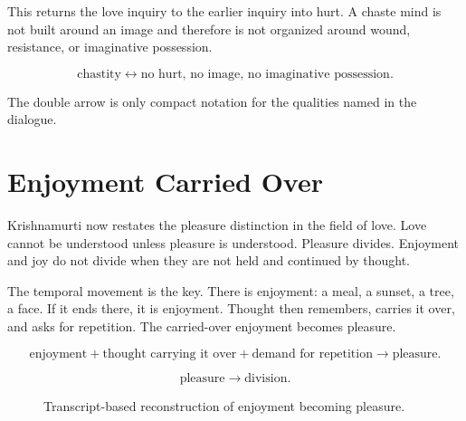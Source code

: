 \documentclass[11pt,oneside]{book}
\begin{document}
This returns the love inquiry to the earlier inquiry into hurt. A chaste mind is not built around an image and therefore is not organized around wound, resistance, or imaginative possession.

\begin{equation}
\text{chastity}
\longleftrightarrow
\text{no hurt, no image, no imaginative possession}.
\end{equation}

The double arrow is only compact notation for the qualities named in the dialogue.

\section{Enjoyment Carried Over}

Krishnamurti now restates the pleasure distinction in the field of love. Love cannot be understood unless pleasure is understood. Pleasure divides. Enjoyment and joy do not divide when they are not held and continued by thought.

The temporal movement is the key. There is enjoyment: a meal, a sunset, a tree, a face. If it ends there, it is enjoyment. Thought then remembers, carries it over, and asks for repetition. The carried-over enjoyment becomes pleasure.

\begin{equation}
\text{enjoyment}
+
\text{thought carrying it over}
+
\text{demand for repetition}
\longrightarrow
\text{pleasure}.
\end{equation}

\begin{equation}
\text{pleasure}
\longrightarrow
\text{division}.
\end{equation}

\begin{figure}
\centering
{}

Transcript-based reconstruction of enjoyment becoming pleasure.
\end{figure}
\end{document}
